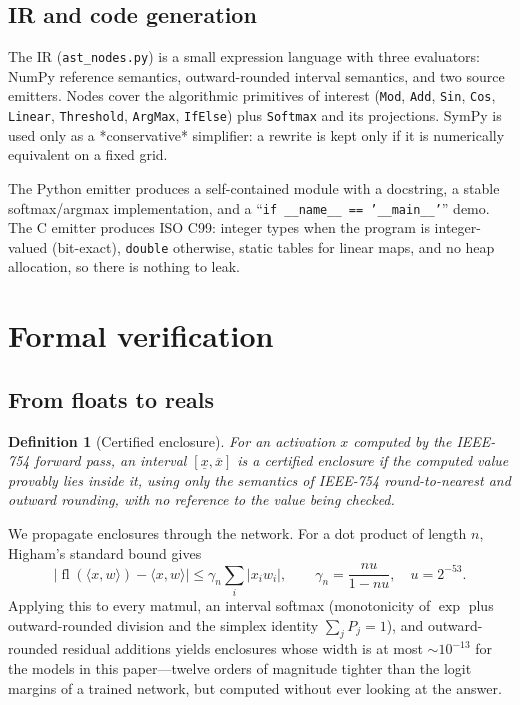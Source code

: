 \documentclass[11pt]{article}
\newtheorem{definition}{Definition}
\newcommand{\code}[1]{\texttt{#1}}
\begin{document}
\subsection{IR and code generation}

The IR (\code{ast\_nodes.py}) is a small expression language with three
evaluators: NumPy reference semantics, outward-rounded interval semantics, and
two source emitters. Nodes cover the algorithmic primitives of interest
(\code{Mod}, \code{Add}, \code{Sin}, \code{Cos}, \code{Linear}, \code{Threshold},
\code{ArgMax}, \code{IfElse}) plus \code{Softmax} and its projections. SymPy is
used only as a *conservative* simplifier: a rewrite is kept only if it is
numerically equivalent on a fixed grid.

The Python emitter produces a self-contained module with a docstring, a stable
softmax/argmax implementation, and a ``\code{if \_\_name\_\_ == '\_\_main\_\_'}'' demo.
The C emitter produces ISO C99: integer types when the program is integer-valued
(bit-exact), \code{double} otherwise, static tables for linear maps, and no heap
allocation, so there is nothing to leak.

\section{Formal verification}
\label{sec:verification}

\subsection{From floats to reals}

\begin{definition}[Certified enclosure]
For an activation $x$ computed by the IEEE-754 forward pass, an interval
$[\underline{x},\overline{x}]$ is a certified enclosure if the computed value
provably lies inside it, using only the semantics of IEEE-754 round-to-nearest
and outward rounding, with no reference to the value being checked.
\end{definition}

We propagate enclosures through the network. For a dot product of length $n$,
Higham's standard bound gives
\begin{equation}
  \bigl|\operatorname{fl}(\langle x,w\rangle) - \langle x,w\rangle\bigr|
  \le \gamma_n \sum_i |x_i w_i|, \qquad
  \gamma_n = \frac{n u}{1-nu}, \quad u = 2^{-53}.
\end{equation}
Applying this to every matmul, an interval softmax (monotonicity of $\exp$ plus
outward-rounded division and the simplex identity $\sum_j P_j = 1$), and
outward-rounded residual additions yields enclosures whose width is at most
$\sim 10^{-13}$ for the models in this paper---twelve orders of magnitude
tighter than the logit margins of a trained network, but computed without ever
looking at the answer.
\end{document}
